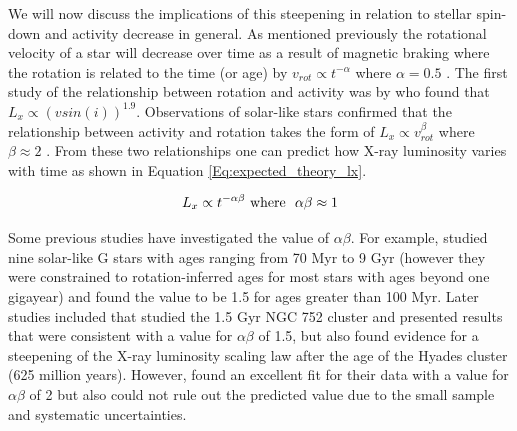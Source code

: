 We will now discuss the implications of this steepening in relation to stellar spin-down and activity decrease in general. As mentioned previously the rotational velocity of a star will decrease over time as a result of magnetic braking where the rotation is related to the time (or age) by $v_{rot} \propto t^{-\alpha}$ where $\alpha = 0.5$ \citep{Skumanich_1972,Meibom_etal_2011}. The first study of the relationship between rotation and activity was by \citealp{Pallavicini_etal_1981} who found that $L_{x} \propto (vsin(i))^{1.9}$. Observations of solar-like stars confirmed that the relationship between activity and rotation takes the form of $L_{x} \propto v_{rot}^{\beta}$ where $\beta \approx 2$ \citep{Pizzolato_etal_2003}. From these two relationships one can predict how X-ray luminosity varies with time as shown in Equation \ref{Eq:expected_theory_lx}.

\begin{equation}
	L_{x} \propto t^{-\alpha\beta} \text{\space where \space} \alpha\beta \approx 1
	\label{Eq:expected_theory_lx}
\end{equation}

Some previous studies have investigated the value of $\alpha\beta$. For example, \citealp{Gudel_etal_1997} studied nine solar-like G stars with ages ranging from 70 Myr to 9 Gyr (however they were constrained to rotation-inferred ages for most stars with ages beyond one gigayear) and found the value to be 1.5 for ages greater than 100 Myr. Later studies included \citealp{Giardino_etal_2008} that studied the 1.5 Gyr NGC 752 cluster and presented results that were consistent with a value for $\alpha\beta$ of 1.5, but also found evidence for a steepening of the X-ray luminosity scaling law after the age of the Hyades cluster (625 million years). However, \citealp{Feigelson_etal_2004} found an excellent fit for their data with a value for $\alpha\beta$ of 2 but also could not rule out the predicted value due to the small sample and systematic uncertainties.

